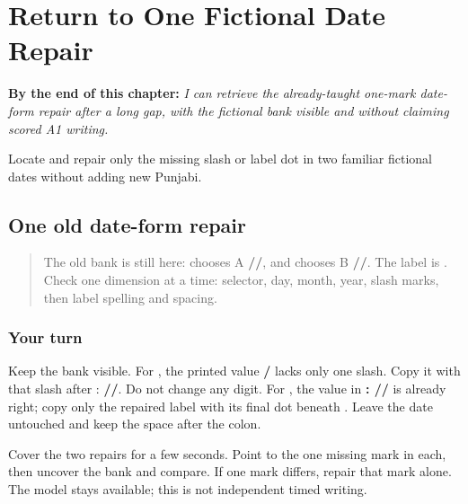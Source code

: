 
\chapter{Return to One Fictional Date Repair}
\label{ch:pa-date-repair-r4}

\begin{chapteropening}
\textbf{By the end of this chapter:} \emph{I can retrieve the already-taught one-mark date-form repair after a long gap, with the fictional bank visible and without claiming scored A1 writing.}

Locate and repair only the missing slash or label dot in two familiar fictional dates without adding new Punjabi.
\end{chapteropening}

\section[\texorpdfstring{\pa{ਤਾਰੀਖ਼}: \_\_/\_\_/\_\_\_\_ (one familiar …)}{ਤਾਰੀਖ਼: \_\_/\_\_/\_\_\_\_ (one familiar …)}]{One old date-form repair}

\label{lesson:PA-R171-date-repair-again}



\begin{quote}
The old bank is still here: \textbf{} chooses A \textbf{//}, and \textbf{} chooses B \textbf{//}. The label is \textbf{}. Check one dimension at a time: selector, day, month, year, slash marks, then label spelling and spacing.
\end{quote}

\subsection*{Your turn}
Keep the bank visible. For \textbf{}, the printed value \textbf{/} lacks only one slash. Copy it with that slash after \textbf{}: \textbf{//}. Do not change any digit. For \textbf{}, the value in \textbf{: //} is already right; copy only the repaired label \textbf{} with its final dot beneath \textbf{}. Leave the date untouched and keep the space after the colon.

\begin{tcolorbox}[breakable,colback=teal!4,colframe=teal!35!black,title={Before you move on}]
Cover the two repairs for a few seconds. Point to the one missing mark in each, then uncover the bank and compare. If one mark differs, repair that mark alone. The model stays available; this is not independent timed writing.
\end{tcolorbox}
